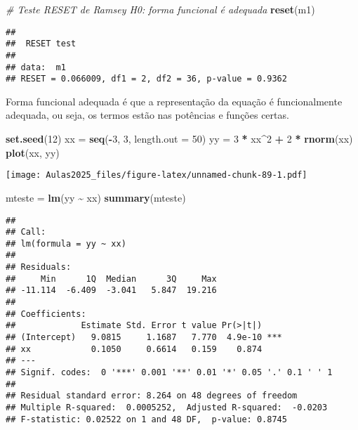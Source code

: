 \documentclass[
]{book}
\newenvironment{Shaded}{\begin{snugshade}}{\end{snugshade}}
\newcommand{\AttributeTok}[1]{\textcolor[rgb]{0.13,0.29,0.53}{#1}}
\newcommand{\CommentTok}[1]{\textcolor[rgb]{0.56,0.35,0.01}{\textit{#1}}}
\newcommand{\DecValTok}[1]{\textcolor[rgb]{0.00,0.00,0.81}{#1}}
\newcommand{\FunctionTok}[1]{\textcolor[rgb]{0.13,0.29,0.53}{\textbf{#1}}}
\newcommand{\NormalTok}[1]{#1}
\newcommand{\OtherTok}[1]{\textcolor[rgb]{0.56,0.35,0.01}{#1}}
\newcommand{\SpecialCharTok}[1]{\textcolor[rgb]{0.81,0.36,0.00}{\textbf{#1}}}
\begin{document}
\begin{Shaded}
\begin{Highlighting}[]
\CommentTok{\# Teste RESET de Ramsey H0: forma funcional é adequada}
\FunctionTok{reset}\NormalTok{(m1)}
\end{Highlighting}
\end{Shaded}

\begin{verbatim}
## 
##  RESET test
## 
## data:  m1
## RESET = 0.066009, df1 = 2, df2 = 36, p-value = 0.9362
\end{verbatim}

Forma funcional adequada é que a representação da equação é
funcionalmente adequada, ou seja, os termos estão nas potências e
funções certas.

\begin{Shaded}
\begin{Highlighting}[]
\FunctionTok{set.seed}\NormalTok{(}\DecValTok{12}\NormalTok{)}
\NormalTok{xx }\OtherTok{=} \FunctionTok{seq}\NormalTok{(}\SpecialCharTok{{-}}\DecValTok{3}\NormalTok{, }\DecValTok{3}\NormalTok{, }\AttributeTok{length.out =} \DecValTok{50}\NormalTok{)}
\NormalTok{yy }\OtherTok{=} \DecValTok{3} \SpecialCharTok{*}\NormalTok{ xx}\SpecialCharTok{\^{}}\DecValTok{2} \SpecialCharTok{+} \DecValTok{2} \SpecialCharTok{*} \FunctionTok{rnorm}\NormalTok{(xx)}
\FunctionTok{plot}\NormalTok{(xx, yy)}
\end{Highlighting}
\end{Shaded}

\texttt{[image: Aulas2025\_files/figure-latex/unnamed-chunk-89-1.pdf]}

\begin{Shaded}
\begin{Highlighting}[]
\NormalTok{mteste }\OtherTok{=} \FunctionTok{lm}\NormalTok{(yy }\SpecialCharTok{\textasciitilde{}}\NormalTok{ xx)}
\FunctionTok{summary}\NormalTok{(mteste)}
\end{Highlighting}
\end{Shaded}

\begin{verbatim}
## 
## Call:
## lm(formula = yy ~ xx)
## 
## Residuals:
##     Min      1Q  Median      3Q     Max 
## -11.114  -6.409  -3.041   5.847  19.216 
## 
## Coefficients:
##             Estimate Std. Error t value Pr(>|t|)    
## (Intercept)   9.0815     1.1687   7.770  4.9e-10 ***
## xx            0.1050     0.6614   0.159    0.874    
## ---
## Signif. codes:  0 '***' 0.001 '**' 0.01 '*' 0.05 '.' 0.1 ' ' 1
## 
## Residual standard error: 8.264 on 48 degrees of freedom
## Multiple R-squared:  0.0005252,  Adjusted R-squared:  -0.0203 
## F-statistic: 0.02522 on 1 and 48 DF,  p-value: 0.8745
\end{verbatim}
\end{document}
